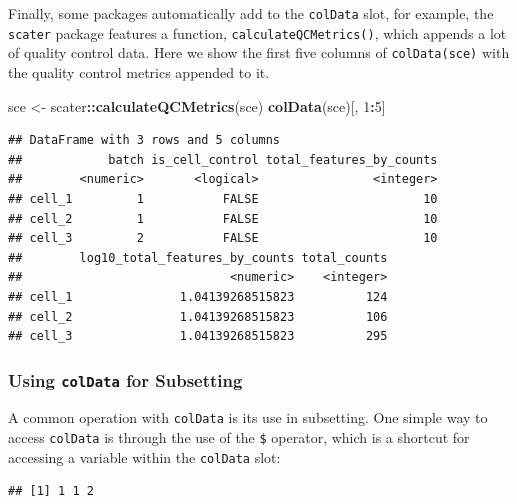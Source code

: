 \documentclass[]{book}
\newenvironment{Shaded}{\begin{snugshade}}{\end{snugshade}}
\newcommand{\DecValTok}[1]{\textcolor[rgb]{0.00,0.00,0.81}{#1}}
\newcommand{\KeywordTok}[1]{\textcolor[rgb]{0.13,0.29,0.53}{\textbf{#1}}}
\newcommand{\NormalTok}[1]{#1}
\newcommand{\OperatorTok}[1]{\textcolor[rgb]{0.81,0.36,0.00}{\textbf{#1}}}
\newcommand{\StringTok}[1]{\textcolor[rgb]{0.31,0.60,0.02}{#1}}
\begin{document}
Finally, some packages automatically add to the \texttt{colData} slot, for example, the \texttt{scater} package features a function, \texttt{calculateQCMetrics()}, which appends a lot of quality control data. Here we show the first five columns of \texttt{colData(sce)} with the quality control metrics appended to it.

\begin{Shaded}
\begin{Highlighting}[]
\NormalTok{sce <-}\StringTok{ }\NormalTok{scater}\OperatorTok{::}\KeywordTok{calculateQCMetrics}\NormalTok{(sce)}
\KeywordTok{colData}\NormalTok{(sce)[, }\DecValTok{1}\OperatorTok{:}\DecValTok{5}\NormalTok{]}
\end{Highlighting}
\end{Shaded}

\begin{verbatim}
## DataFrame with 3 rows and 5 columns
##            batch is_cell_control total_features_by_counts
##        <numeric>       <logical>                <integer>
## cell_1         1           FALSE                       10
## cell_2         1           FALSE                       10
## cell_3         2           FALSE                       10
##        log10_total_features_by_counts total_counts
##                             <numeric>    <integer>
## cell_1               1.04139268515823          124
## cell_2               1.04139268515823          106
## cell_3               1.04139268515823          295
\end{verbatim}

\hypertarget{using-coldata-for-subsetting}{%
\subsubsection{\texorpdfstring{Using \texttt{colData} for Subsetting}{Using colData for Subsetting}}\label{using-coldata-for-subsetting}}

A common operation with \texttt{colData} is its use in subsetting. One simple way to access \texttt{colData} is through the use of the \texttt{\$} operator, which is a shortcut for accessing a variable within the \texttt{colData} slot:

\begin{Shaded}
\end{Shaded}

\begin{verbatim}
## [1] 1 1 2
\end{verbatim}
\end{document}
